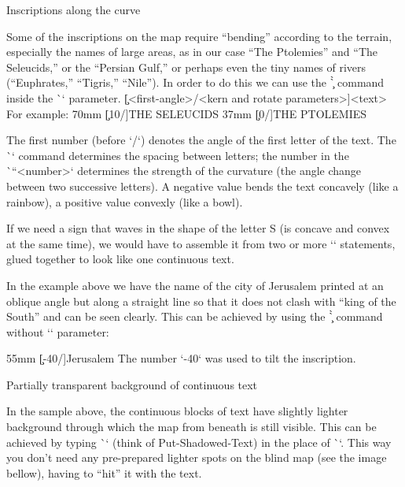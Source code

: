 {{\secc[maptitles] Inscriptions along the curve

Some of the inscriptions on the map require “bending” according to the terrain, especially the 
names of large areas, as in our case  “The Ptolemies” and “The Seleucids,” or the “Persian 
Gulf,” or perhaps even the tiny names of rivers (“Euphrates,” “Tigris,” “Nile”). 
In order to do this we can use the \`\c` command inside the \`\puttext` parameter.
\begtt
\c[<first-angle>/<kern and rotate parameters>]{<text>}
\endtt
For example:
\begtt
\puttext 62mm 70mm {\c[10/\kern7pt]{THE SELEUCIDS}}
\puttext 2mm 37mm {\c[0/\kern4pt]{THE PTOLEMIES}}
\endtt

The first number (before `/`) denotes the angle of the first letter of the text.
The \`\kern` command determines the spacing between letters; the number in the \`\pdfrotate``{<number>}` 
determines the strength of the curvature (the angle change between two successive letters). A negative value bends the text concavely 
(like a rainbow), a positive value convexly (like a bowl).

If we need a sign that waves in the shape of the letter S (is concave and convex at 
the same time), we would have to assemble it from two or more `\puttext` statements, glued 
together to look like one continuous text. 


In the example above we have the name of the city of Jerusalem printed at an oblique angle but along a straight line so that it 
does not clash with “king of the South” and can be seen clearly.
This can be achieved by using the \`\c` command without `\pdfrotate` parameter:

\begtt
\puttext 48mm 55mm {\c[-40/\kern1pt]{Jerusalem}}
\endtt
The number `-40` was used to tilt the inscription.


\secc[bkgrnd] Partially transparent background of continuous text

In the sample above, the continuous blocks of text have slightly lighter background 
through which the map from beneath is still visible.
This can be achieved by typing \`\putstext` (think of Put-Shadowed-Text) in the place of 
\`\puttext`. This way you don't need any pre-prepared lighter spots on the blind map (see the 
image bellow), having to “hit” it with the text. 


\medskip
\centerline{\picw=150pt }

\smallskip

}}
